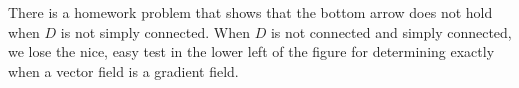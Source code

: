 There is a homework problem that shows that the bottom arrow
does not hold when $D$ is not simply connected.  When $D$ is not
connected and simply  connected, we lose the nice, easy test in the
lower left of the figure for determining exactly when a vector field
is a gradient field.












